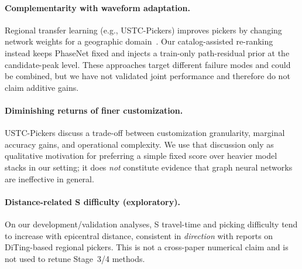 
\paragraph{Complementarity with waveform adaptation.}
Regional transfer learning (e.g., USTC-Pickers) improves pickers by changing
network weights for a geographic domain~\citep{zhu2023ustcpickers}.
Our catalog-assisted re-ranking instead keeps PhaseNet fixed and injects a
train-only path-residual prior at the candidate-peak level.
These approaches target different failure modes and could be combined, but we
have not validated joint performance and therefore do not claim additive gains.

\paragraph{Diminishing returns of finer customization.}
USTC-Pickers discuss a trade-off between customization granularity, marginal
accuracy gains, and operational complexity.
We use that discussion only as qualitative motivation for preferring a simple
fixed score over heavier model stacks in our setting; it does \emph{not}
constitute evidence that graph neural networks are ineffective in general.

\paragraph{Distance-related S difficulty (exploratory).}
On our development/validation analyses, S travel-time and picking difficulty
tend to increase with epicentral distance, consistent in \emph{direction} with
reports on DiTing-based regional pickers.
This is not a cross-paper numerical claim and is not used to retune Stage~3/4
methods.

